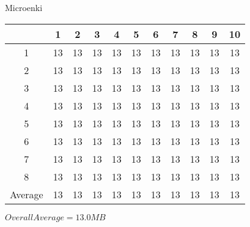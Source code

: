 \begin{center}
    Microenki\\
    \begin{tabular}{ |c|c|c|c|c|c|c|c|c|c|c| }
        \hline
          & 1 & 2 & 3 & 4 & 5 & 6 & 7 & 8 & 9 & 10 \\
        \hline
        \hline
        1 & 13 & 13 & 13 & 13 & 13 & 13 & 13 & 13 & 13 & 13 \\
        2 & 13 & 13 & 13 & 13 & 13 & 13 & 13 & 13 & 13 & 13 \\
        3 & 13 & 13 & 13 & 13 & 13 & 13 & 13 & 13 & 13 & 13 \\
        4 & 13 & 13 & 13 & 13 & 13 & 13 & 13 & 13 & 13 & 13 \\
        5 & 13 & 13 & 13 & 13 & 13 & 13 & 13 & 13 & 13 & 13 \\
        6 & 13 & 13 & 13 & 13 & 13 & 13 & 13 & 13 & 13 & 13 \\
        7 & 13 & 13 & 13 & 13 & 13 & 13 & 13 & 13 & 13 & 13 \\
        8 & 13 & 13 & 13 & 13 & 13 & 13 & 13 & 13 & 13 & 13 \\
        \hline
        \hline
        Average & 13 & 13 & 13 & 13 & 13 & 13 & 13 & 13 & 13 & 13 \\
        \hline
    \end{tabular}
    $ Overall Average = 13.0 MB $
\end{center}

